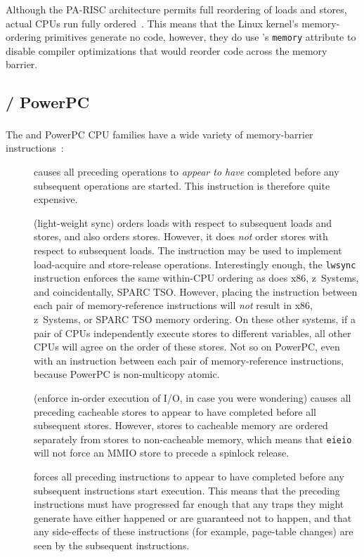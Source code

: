Although the PA-RISC architecture permits full reordering of loads and
stores, actual CPUs run fully ordered~\cite{GerryKane96a}.
This means that the Linux kernel's memory-ordering primitives generate
no code, however, they do use \GCC's {\tt memory} attribute to disable
compiler optimizations that would reorder code across the memory
barrier.

\subsection{\Power{} / PowerPC}
\label{sec:memorder:POWER / PowerPC}

The \Power{} and PowerPC\textsuperscript{\textregistered}
CPU families have a wide variety of memory-barrier
instructions~\cite{PowerPC94,MichaelLyons05a}:
\begin{description}
\item	[] causes all preceding operations to {\em appear to have}
	completed before any subsequent operations are started.
	This instruction is therefore quite expensive.
\item	[] (light-weight sync) orders loads with respect to
	subsequent loads and stores, and also orders stores.
	However, it does {\em not} order stores with respect to subsequent
	loads.
	The  instruction may be used to implement
	load-acquire and store-release operations.
	Interestingly enough, the {\tt lwsync} instruction enforces
	the same within-CPU ordering as does x86, z~Systems, and coincidentally,
	SPARC TSO.
	However, placing the  instruction between each
	pair of memory-reference instructions will \emph{not}
	result in x86, z~Systems, or SPARC TSO memory ordering.
	On these other systems, if a pair of CPUs independently execute
	stores to different variables, all other CPUs will agree on the
	order of these stores.
	Not so on PowerPC, even with an  instruction between each
	pair of memory-reference instructions, because PowerPC is
	non-multicopy atomic.
\item	[] (enforce in-order execution of I/O, in case you
	were wondering) causes all preceding cacheable stores to appear
	to have completed before all subsequent stores.
	However, stores to cacheable memory are ordered separately from
	stores to non-cacheable memory, which means that {\tt eieio}
	will not force an MMIO store to precede a spinlock release.
\item	[] forces all preceding instructions to appear to have
	completed before any subsequent instructions start execution.
	This means that the preceding instructions must have progressed
	far enough that any traps they might generate have either happened
	or are guaranteed not to happen, and that any side-effects of
	these instructions (for example, page-table changes) are seen by the
	subsequent instructions.
\end{description}

